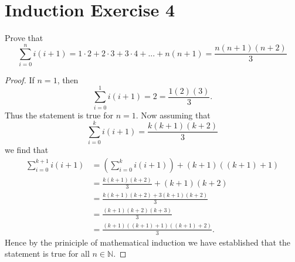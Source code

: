 \documentclass{article}
\begin{document}
\section*{Induction Exercise 4}
Prove that
\[
	\sum_{i=0}^{n} i(i+1) = 1\cdot2 + 2\cdot3 + 3\cdot4 + ... + n(n+1) = \frac{n(n+1)(n+2)}{3}
\]
\begin{proof}
	If $n=1$, then
	\[
		\sum_{i=0}^{1} i(i+1) = 2 = \frac{1(2)(3)}{3}.
	\]
	Thus the statement is true for $n=1$.
	\newline\newline
	Now assuming that
	\[
		\sum_{i=0}^{k} i(i+1) = \frac{k(k+1)(k+2)}{3}
	\]
	we find that 
	\begin{align*}
		\sum_{i=0}^{k+1} i(i+1) & = \left( \sum_{i=0}^{k} i(i+1) \right) + (k+1)((k+1)+1) \\
				        & = \frac{k(k+1)(k+2)}{3} + (k+1)(k+2) \\
				        & = \frac{k(k+1)(k+2) + 3(k+1)(k+2)}{3} \\
				        & = \frac{(k+1)(k+2)(k+3)}{3} \\
				        & = \frac{(k+1)((k+1)+1)((k+1)+2)}{3}.
	\end{align*}
	Hence by the priniciple of mathematical induction we have established that the statement is true for all $n \in \mathbb{N}$.
\end{proof}
\end{document}
